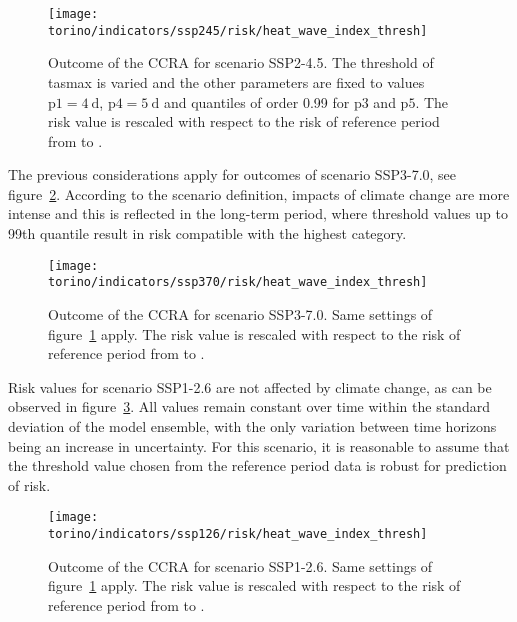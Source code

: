 \begin{figure}[h]
  \centering
  \texttt{[image: torino/indicators/ssp245/risk/heat\_wave\_index\_thresh]}
  \caption{Outcome of the \gls{CCRA} for scenario SSP2-4.5. The threshold of \gls{tasmax} is varied and the other parameters are fixed to values $\mathrm{p1} = \qty{4}{\day}$, $\mathrm{p4} = \qty{5}{\day}$ and quantiles of order 0.99 for $\mathrm{p3}$ and $\mathrm{p5}$. The risk value is rescaled with respect to the risk of reference period from  to .}
  \label{fig:ssp245_risk_heat_wave_index_thresh-heat_wave_max_length_thresh_tasmax}
\end{figure}

The previous considerations apply for outcomes of scenario SSP3-7.0, see figure~\ref{fig:ssp370_risk_heat_wave_index_thresh-heat_wave_max_length_thresh_tasmax}. According to the scenario definition, impacts of climate change are more intense and this is reflected in the long-term period, where threshold values up to 99th quantile result in risk compatible with the highest category.

\begin{figure}[h]
  \centering
  \texttt{[image: torino/indicators/ssp370/risk/heat\_wave\_index\_thresh]}
  \caption{Outcome of the \gls{CCRA} for scenario SSP3-7.0. Same settings of figure~\ref{fig:ssp245_risk_heat_wave_index_thresh-heat_wave_max_length_thresh_tasmax} apply. The risk value is rescaled with respect to the risk of reference period from  to .}
  \label{fig:ssp370_risk_heat_wave_index_thresh-heat_wave_max_length_thresh_tasmax}
\end{figure}

Risk values for scenario SSP1-2.6 are not affected by climate change, as can be observed in figure~\ref{fig:ssp126_risk_heat_wave_index_thresh-heat_wave_max_length_thresh_tasmax}. All values remain constant over time within the standard deviation of the model ensemble, with the only variation between time horizons being an increase in uncertainty. For this scenario, it is reasonable to assume that the threshold value chosen from the reference period data is robust for prediction of risk.

\begin{figure}[h]
  \centering
  \texttt{[image: torino/indicators/ssp126/risk/heat\_wave\_index\_thresh]}
  \caption{Outcome of the \gls{CCRA} for scenario SSP1-2.6. Same settings of figure~\ref{fig:ssp245_risk_heat_wave_index_thresh-heat_wave_max_length_thresh_tasmax} apply. The risk value is rescaled with respect to the risk of reference period from  to .}
  \label{fig:ssp126_risk_heat_wave_index_thresh-heat_wave_max_length_thresh_tasmax}
\end{figure}

